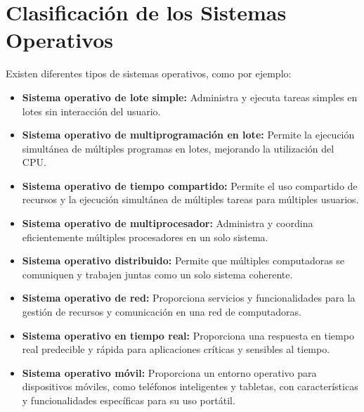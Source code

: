 \documentclass[11pt,twoside]{book}
\begin{document}
\section{Clasificación de los Sistemas Operativos}
Existen diferentes tipos de sistemas operativos, como por ejemplo: 
\begin{itemize}
      \item\textbf{Sistema operativo de lote simple:} Administra y ejecuta tareas simples en lotes sin interacción del usuario.
      \item \textbf{Sistema operativo de multiprogramación en lote:} Permite la ejecución simultánea de múltiples programas en lotes, mejorando la utilización del CPU.
      \item \textbf{Sistema operativo de tiempo compartido:} Permite el uso compartido de recursos y la ejecución simultánea de múltiples tareas para múltiples usuarios.
      \item \textbf{Sistema operativo de multiprocesador:} Administra y coordina eficientemente múltiples procesadores en un solo sistema.
      \item \textbf{Sistema operativo distribuido:} Permite que múltiples computadoras se comuniquen y trabajen juntas como un solo sistema coherente.
      \item \textbf{Sistema operativo de red:} Proporciona servicios y funcionalidades para la gestión de recursos y comunicación en una red de computadoras.
      \item \textbf{Sistema operativo en tiempo real:} Proporciona una respuesta en tiempo real predecible y rápida para aplicaciones críticas y sensibles al tiempo.
      \item \textbf{Sistema operativo móvil:} Proporciona un entorno operativo para dispositivos móviles, como teléfonos inteligentes y tabletas, con características y funcionalidades específicas para su uso portátil.
  \end{itemize}
  
\vspace{5pt}
\end{document}
